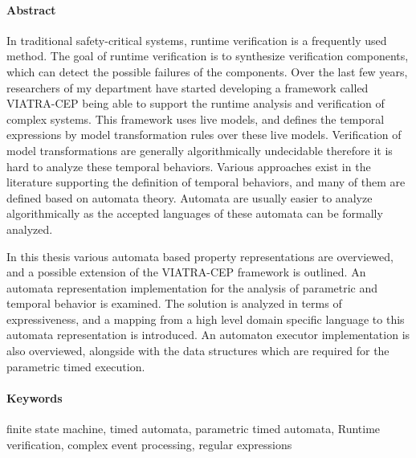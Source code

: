\cleardoublepage

\paragraph*{Abstract}
{}
\thispagestyle{plain}

In traditional safety-critical systems, runtime verification is a frequently used
method. The goal of runtime verification is to synthesize verification components, which
can detect the possible failures of the components. Over the last few years, researchers
of my department have started developing a framework called VIATRA-CEP being able
to support the runtime analysis and verification of complex systems. This framework
uses live models, and defines the temporal expressions by model transformation rules
over these live models. Verification of model transformations are generally algorithmically undecidable therefore it is hard to analyze these temporal behaviors. 
Various approaches exist in the literature supporting the definition of temporal behaviors, and many of them are defined based on automata theory.
Automata are usually easier to analyze algorithmically as the accepted languages of these automata can be formally analyzed.

In this thesis various automata based property representations are overviewed,
and a possible extension of the VIATRA-CEP framework is outlined. An automata
representation implementation for the analysis of parametric and temporal behavior is examined. The
solution is analyzed in terms of expressiveness, and a mapping from a high level domain
specific language to this automata representation is introduced.
An automaton executor implementation is also overviewed, alongside with the data structures which are required for the parametric timed execution. 


\paragraph{Keywords} finite state machine, timed automata, parametric timed automata, Runtime verification, complex event processing, regular expressions

